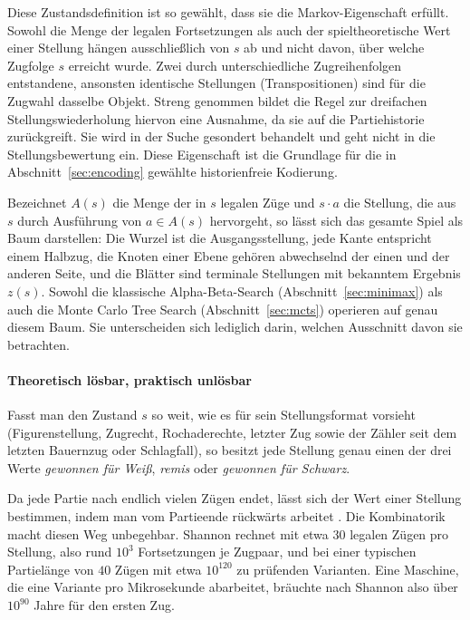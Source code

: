 \documentclass[
  a4paper, 12pt,
  parskip=half,
  headings=small,
  bibliography=totoc
]{scrartcl}
\begin{document}
Diese Zustandsdefinition ist so gewählt, dass sie die Markov-Eigenschaft erfüllt. Sowohl die Menge der legalen Fortsetzungen als auch der spieltheoretische Wert einer Stellung hängen ausschließlich von \(s\) ab und nicht davon, über welche Zugfolge \(s\) erreicht wurde. Zwei durch unterschiedliche Zugreihenfolgen entstandene, ansonsten identische Stellungen (Transpositionen) sind für die Zugwahl dasselbe Objekt. Streng genommen bildet die Regel zur dreifachen Stellungswiederholung hiervon eine Ausnahme, da sie auf die Partiehistorie zurückgreift. Sie wird in der Suche gesondert behandelt und geht nicht in die Stellungsbewertung ein. Diese Eigenschaft ist die Grundlage für die in Abschnitt~\ref{sec:encoding} gewählte historienfreie Kodierung.

Bezeichnet \(A(s)\) die Menge der in \(s\) legalen Züge und \(s\cdot a\) die Stellung, die aus \(s\) durch Ausführung von \(a \in A(s)\) hervorgeht, so lässt sich das gesamte Spiel als Baum darstellen: Die Wurzel ist die Ausgangsstellung, jede Kante entspricht einem Halbzug, die Knoten einer Ebene gehören abwechselnd der einen und der anderen Seite, und die Blätter sind terminale Stellungen mit bekanntem Ergebnis \(z(s)\). Sowohl die klassische Alpha-Beta-Search (Abschnitt~\ref{sec:minimax}) als auch die Monte Carlo Tree Search (Abschnitt~\ref{sec:mcts}) operieren auf genau diesem Baum. Sie unterscheiden sich lediglich darin, welchen Ausschnitt davon sie betrachten.

\paragraph{Theoretisch lösbar, praktisch unlösbar}
Fasst man den Zustand $s$ so weit, wie es \textcite{shannon1950} für sein Stellungsformat vorsieht (Figurenstellung, Zugrecht, Rochaderechte, letzter Zug sowie der Zähler seit dem letzten Bauernzug oder Schlagfall), so besitzt jede Stellung genau einen der drei Werte \emph{gewonnen für Weiß}, \emph{remis} oder \emph{gewonnen für Schwarz}. 

Da jede Partie nach endlich vielen Zügen endet, lässt sich der Wert einer Stellung bestimmen, indem man vom Partieende rückwärts arbeitet \parencite{shannon1950}. 
Die Kombinatorik macht diesen Weg unbegehbar. Shannon rechnet mit etwa $30$ legalen Zügen pro Stellung, also rund $10^{3}$ Fortsetzungen je Zugpaar, und bei einer typischen Partielänge von $40$ Zügen mit etwa $10^{120}$ zu prüfenden Varianten. Eine Maschine, die eine Variante pro Mikrosekunde abarbeitet, bräuchte nach Shannon also über $10^{90}$ Jahre für den ersten Zug.
\end{document}
